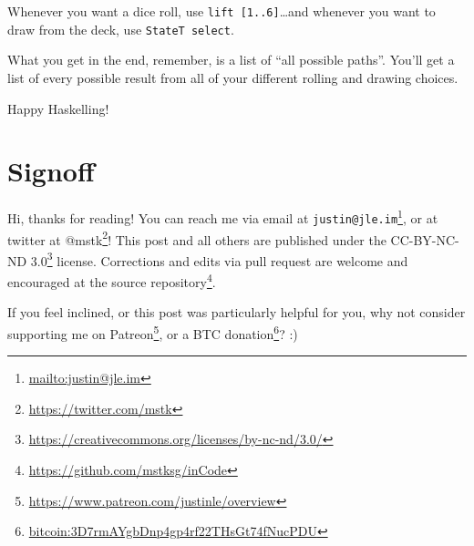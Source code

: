 \documentclass[]{article}
\renewcommand{\href}[2]{#2\footnote{\url{#1}}}
\begin{document}
Whenever you want a dice roll, use \texttt{lift\ {[}1..6{]}}\ldots{}and whenever
you want to draw from the deck, use \texttt{StateT\ select}.

What you get in the end, remember, is a list of ``all possible paths''. You'll
get a list of every possible result from all of your different rolling and
drawing choices.

Happy Haskelling!

\hypertarget{signoff}{%
\section{Signoff}\label{signoff}}

Hi, thanks for reading! You can reach me via email at
\href{mailto:justin@jle.im}{\nolinkurl{justin@jle.im}}, or at twitter at
\href{https://twitter.com/mstk}{@mstk}! This post and all others are published
under the \href{https://creativecommons.org/licenses/by-nc-nd/3.0/}{CC-BY-NC-ND
3.0} license. Corrections and edits via pull request are welcome and encouraged
at \href{https://github.com/mstksg/inCode}{the source repository}.

If you feel inclined, or this post was particularly helpful for you, why not
consider \href{https://www.patreon.com/justinle/overview}{supporting me on
Patreon}, or a \href{bitcoin:3D7rmAYgbDnp4gp4rf22THsGt74fNucPDU}{BTC donation}?
:)
\end{document}

